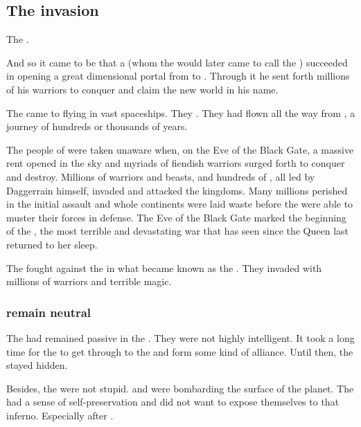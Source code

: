 \subsection{The \bane{} invasion}
\index{\firstbanewar}
The \banes {}.

And so it came to be that a \baneking{} (whom the \dragons{} would later came to call the \quo{\Voidbringer}) succeeded in opening a great dimensional portal from \Erebos{} to \Miith{}. 
Through it he sent forth millions of his \bane{} warriors to conquer and claim the new world in his name. 

The \banes{} came to \Miith{} flying in vast spaceships. They . 
They had flown all the way from \Erebos{}, a journey of hundreds or thousands of years. 

The people of \Miith{} were taken unaware when, on the Eve of the Black Gate, a massive rent opened in the sky and myriads of fiendish \bane{} warriors surged forth to conquer and destroy. 
Millions of \bane{} warriors and beasts, and hundreds of \banelords, all led by Daggerrain himself, invaded and attacked the \draconic{} kingdoms. 
Many millions perished in the initial assault and whole continents were laid waste before the \ophidians{} were able to muster their forces in defense. 
The Eve of the Black Gate marked the beginning of the \Banewar, the most terrible and devastating war that \Miith{} has seen since the \Kraken{} Queen last returned to her sleep. 

The \banes{} fought against the \ophidians{} in what became known as the \firstbanewar. 
They invaded with millions of \bane{} warriors and terrible magic. 





\subsubsection{\Noggyaleth remain neutral}
The \noggyaleth had remained passive in the \firstbanewar. 
They were not highly intelligent. 
It took a long time for the \banes to get through to the \noggyaleth and form some kind of alliance. 
Until then, the \noggyaleth stayed hidden. 

Besides, the \noggyaleth were not stupid.
\Banes and \ophidians were bombarding the surface of the planet.
The \noggyaleth had a sense of self-preservation and did not want to expose themselves to that inferno.
Especially after . 






